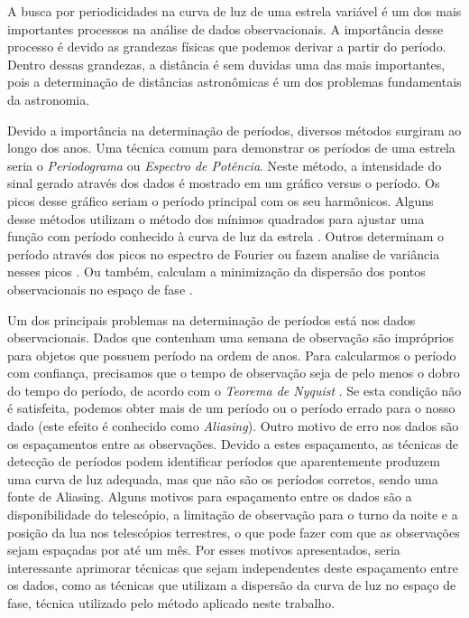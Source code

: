 A busca por periodicidades na curva de luz de uma estrela variável é um dos mais importantes processos na análise de dados observacionais. A importância desse processo é devido as grandezas físicas que podemos derivar a partir do período. Dentro dessas grandezas, a distância é sem duvidas uma das mais importantes, pois a determinação de distâncias astronômicas é um dos problemas fundamentais da astronomia.

Devido a importância na determinação de períodos, diversos métodos surgiram ao longo dos anos. Uma técnica comum para demonstrar os períodos de uma estrela seria o \textit{Periodograma} ou \textit{Espectro de Potência}. Neste método, a intensidade do sinal gerado através dos dados é mostrado em um gráfico versus o período. Os picos desse gráfico seriam o período principal com os seu harmônicos. Alguns desse métodos utilizam o método dos mínimos quadrados para ajustar uma função com período conhecido à curva de luz da estrela \citep{lomb}. Outros determinam o período através dos picos no espectro de Fourier \citep{mello81} ou fazem analise de variância nesses picos \citep{aov}. Ou também, calculam a minimização da dispersão dos pontos observacionais no espaço de fase \citep{Cincotta1999, entropy, ce}.

Um dos principais problemas na determinação de períodos está nos dados observacionais. Dados que contenham uma semana de observação são impróprios para objetos que possuem período na ordem de anos. Para calcularmos o período com confiança, precisamos que o tempo de observação seja de pelo menos o dobro do tempo do período, de acordo com o \textit{Teorema de Nyquist} \citep{Nyquist1928}. Se esta condição não é satisfeita, podemos obter mais de um período ou o período errado para o nosso dado (este efeito é conhecido como \textit{Aliasing}). Outro motivo de erro nos dados são os espaçamentos entre as observações. Devido a estes espaçamento, as técnicas de detecção de períodos podem identificar períodos que aparentemente produzem uma curva de luz adequada, mas que não são os períodos corretos, sendo uma fonte de Aliasing. Alguns motivos para espaçamento entre os dados são a disponibilidade do telescópio, a limitação de observação para o turno da noite e a posição da lua nos telescópios terrestres, o que pode fazer com que as observações sejam espaçadas por até um mês. Por esses motivos apresentados, seria interessante aprimorar técnicas que sejam independentes deste espaçamento entre os dados, como as técnicas que utilizam a dispersão da curva de luz no espaço de fase, técnica utilizado pelo método aplicado neste trabalho.
